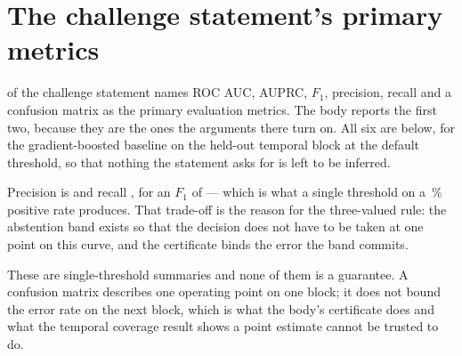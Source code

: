 \section{The challenge statement's primary metrics}

 of the challenge statement names ROC AUC, AUPRC, $F_1$, precision, recall and a
confusion matrix as the primary evaluation metrics. The body reports the first two, because
they are the ones the arguments there turn on. All six are below, for the
gradient-boosted baseline on the held-out temporal block at the default threshold, so that
nothing the statement asks for is left to be inferred.



Precision is \ClaimBaselineTestPrecision{} and recall \ClaimBaselineTestRecall{}, for an
$F_1$ of \ClaimBaselineTestFOne{} --- which is what a single threshold on a
\ClaimTestFraudRate\,\% positive rate produces. That trade-off is the reason for the
three-valued rule: the abstention band exists so that the decision does not have to be taken
at one point on this curve, and the certificate binds the error the band commits.

These are single-threshold summaries and none of them is a guarantee. A confusion matrix
describes one operating point on one block; it does not bound the error rate on the next
block, which is what the body's certificate does and what the temporal coverage result shows
a point estimate cannot be trusted to do.
